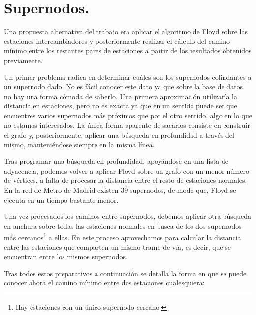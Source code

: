\documentclass[spanish, a4paper, 12pt] {article}
\begin{document}
\section{Supernodos.}
Una propuesta alternativa del trabajo era aplicar el algoritmo de Floyd sobre las estaciones intercambiadores y posteriormente realizar el cálculo del camino mínimo entre los restantes pares de estaciones a partir de los resultados obtenidos previamente.\\ \par
Un primer problema radica en determinar cuáles son los supernodos colindantes a un supernodo dado. No es fácil conocer este dato ya que sobre la base de datos no hay una forma cómoda de saberlo. Una primera aproximación utilizaría la distancia en estaciones, pero no es exacta ya que en un sentido puede ser que encuentres varios supernodos más próximos que por el otro sentido, algo en lo que no estamos interesados. La única forma aparente de sacarlos consiste en construir el grafo y, posteriormente, aplicar una búsqueda en profundidad a través del mismo, manteniéndose siempre en la misma línea.\\ \par
Tras programar una búsqueda en profundidad, apoyándose en una lista de adyacencia, podemos volver a aplicar Floyd sobre un grafo con un menor número de vértices, a falta de procesar la distancia entre el resto de estaciones normales. En la red de Metro de Madrid existen 39 supernodos, de modo que, Floyd se ejecuta en un tiempo bastante menor.\\ \par
Una vez procesados los caminos entre supernodos, debemos aplicar otra búsqueda en anchura sobre todas las estaciones normales en busca de los dos supernodos más cercanos\footnote{Hay estaciones con un único supernodo cercano.} a ellas. En este proceso aprovechamos para calcular la distancia entre las estaciones que comparten un mismo tramo de vía, es decir, que se encuentran entre los mismos supernodos. \\ \par
Tras todos estos preparativos a continuación se detalla la forma en que se puede conocer ahora el camino mínimo entre dos estaciones cualesquiera:
\end{document}
